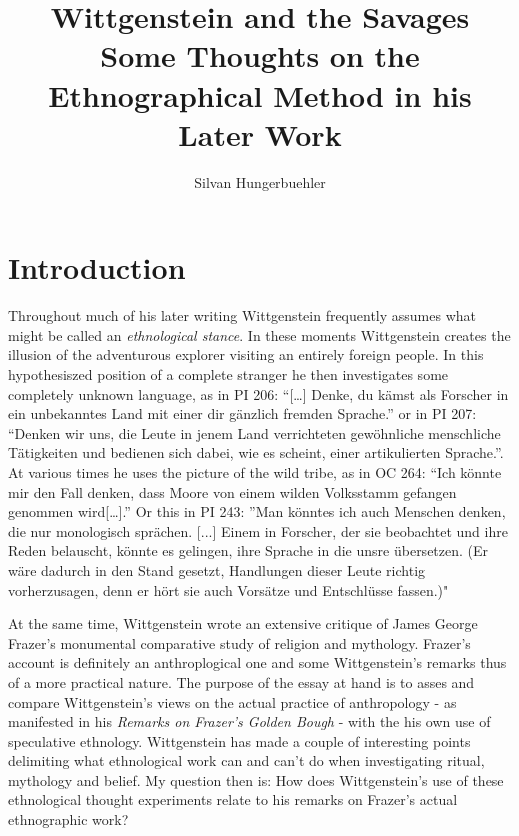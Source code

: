 \documentclass{article}
\title{Wittgenstein and the Savages\\
\large Some Thoughts on the Ethnographical Method in his Later Work}
\date{}
\author{Silvan Hungerbuehler}
\begin{document}
\maketitle
\section{Introduction}
Throughout much of his later writing Wittgenstein frequently assumes what might be called an \textit{ethnological stance}. In these moments Wittgenstein creates the illusion of the adventurous explorer visiting an entirely foreign people. In this hypothesiszed position of a complete stranger
he then investigates some completely unknown language, as in PI 206: “[…] Denke, du kämst als Forscher in ein unbekanntes Land mit einer dir gänzlich fremden Sprache.” or in PI 207: “Denken wir uns, die Leute in jenem Land verrichteten gewöhnliche menschliche Tätigkeiten und bedienen sich dabei, wie es scheint, einer artikulierten Sprache.”. At various times he uses the picture of the wild tribe, as in OC 264: “Ich könnte mir den Fall denken, dass Moore von einem wilden Volksstamm gefangen genommen wird[…].” Or this in PI 243: ''Man k{\"o}nntes ich auch Menschen denken, die nur monologisch spr{\"a}chen. [...] Einem  in Forscher, der sie beobachtet und ihre Reden belauscht, k{\"o}nnte es gelingen, ihre Sprache in die unsre {\"u}bersetzen. (Er w{\"a}re dadurch in den Stand gesetzt, Handlungen dieser Leute richtig vorherzusagen, denn er h{\"o}rt sie auch Vors{\"a}tze und Entschl{\"u}sse fassen.)"

At the same time, Wittgenstein wrote an extensive critique of James George Frazer's monumental comparative study of religion and mythology. Frazer's account is definitely an anthroplogical one and some Wittgenstein's remarks thus of a more practical nature. The purpose of the essay at hand is to asses and compare Wittgenstein's views on the actual practice of anthropology - as manifested in his \textit{Remarks on Frazer's Golden Bough} - with the his own use of speculative ethnology. Wittgenstein has made a couple of interesting points delimiting what ethnological work can and can’t do when investigating ritual, mythology and belief. My question then is: How does Wittgenstein’s use of these ethnological thought experiments relate to his remarks on Frazer’s actual ethnographic work?
\end{document}
